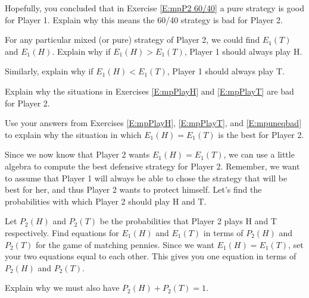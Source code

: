 \begin{xca}\label{E:mp60/40badP2}
Hopefully, you concluded that in Exercise \ref{E:mpP2 60/40} a pure strategy is good for Player 1. Explain why this means the 60/40 strategy is bad for Player 2.
\end{xca}

\begin{xca}\label{E:mpPlayH}
For any particular mixed (or pure) strategy of Player 2, we could find $E_1(T)$ and $E_1(H)$. Explain why if $E_1(H) > E_1(T)$, Player 1 should always play H. 
\end{xca}

\begin{xca}\label{E:mpPlayT}
Similarly, explain why if $E_1(H) < E_1(T)$, Player 1 should always play T. 
\end{xca}


\begin{xca}\label{E:mpuneqbad}
Explain why the situations in Exercises \ref{E:mpPlayH} and \ref{E:mpPlayT} are bad for Player 2.
\end{xca}

\begin{xca}
Use your answers from Exercises \ref{E:mpPlayH}, \ref{E:mpPlayT}, and \ref{E:mpuneqbad} to explain why the situation in which $E_1(H)=E_1(T)$ is the best for Player 2.
\end{xca}


Since we now know that Player 2 wants $E_1(H)=E_1(T)$, we can use a little algebra to compute the best defensive strategy for Player 2. Remember, we want to assume that Player 1 will always be able to chose the strategy that will be best for her, and thus Player 2 wants to protect himself. Let's find the probabilities with which Player 2 should play H  and T.


\begin{xca}\label{E:mpequations}
Let $P_2(H)$ and $P_2(T)$ be the probabilities that Player 2 plays H and T respectively. Find equations for $E_1(H)$ and $E_1(T)$ in terms of $P_2(H)$ and $P_2(T)$ for the game of matching pennies. Since we want $E_1(H)=E_1(T)$, set your two equations equal to each other. This gives you one equation in terms of $P_2(H)$ and $P_2(T)$.
\end{xca}

\begin{xca}\label{E:explainprobeq}
Explain why we must also have $P_2(H)+P_2(T)=1$.
\end{xca}

